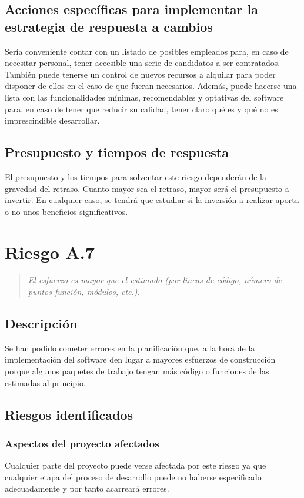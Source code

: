 \documentclass[11pt,a4paper,spanish,twoside]{book}
\begin{document}
\subsection{Acciones específicas para implementar la estrategia de respuesta
  a cambios}
Sería conveniente contar con un listado de posibles empleados para, en caso
de necesitar personal, tener accesible una serie de candidatos a ser
contratados. También puede tenerse un control de nuevos recursos a alquilar
para poder disponer de ellos en el caso de que fueran necesarios. Además,
puede hacerse una lista con las funcionalidades mínimas, recomendables y
optativas del software para, en caso de tener que reducir su calidad, tener
claro qué es y qué no es imprescindible desarrollar.

\subsection{Presupuesto y tiempos de respuesta}
El presupuesto y los tiempos para solventar este riesgo dependerán de la
gravedad del retraso. Cuanto mayor sea el retraso, mayor será el presupuesto
a invertir. En cualquier caso, se tendrá que estudiar si la
inversión a realizar aporta o no unos beneficios significativos.

\section{Riesgo A.7}
\begin{quote}
\emph{El esfuerzo es mayor que el estimado (por líneas de código, número de
  puntos función, módulos, etc.).}
\end{quote}

\subsection{Descripción}
Se han podido cometer errores en la planificación que, a la hora de la
implementación del software den lugar a mayores esfuerzos de construcción
porque algunos paquetes de trabajo tengan más código o funciones de las
estimadas al principio.

\subsection{Riesgos identificados}
\subsubsection{Aspectos del proyecto afectados}
Cualquier parte del proyecto puede verse afectada por este riesgo ya que
cualquier etapa del proceso de desarrollo puede no haberse especificado
adecuadamente y por tanto acarreará errores.
\end{document}
